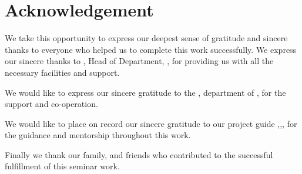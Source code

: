 \chapter*{Acknowledgement}%
%



\par We take this opportunity to express our deepest sense of gratitude and sincere thanks to everyone who helped us to complete this work successfully. We express our sincere thanks to \hod, Head of Department, \dept, \college\hspace*{2pt} \collegeplace \hspace*{2pt} for providing  us with all the necessary facilities and support.\par

We would like to express our sincere gratitude to the \projcordinatorA, \hspace*{2pt} department of \hspace*{2pt} \dept, \hspace*{2pt} \college \hspace*{2pt} \collegeplace \hspace*{2pt} for the support and co-operation.

We would like to place on record our sincere gratitude to our project guide \guide,\hspace*{2pt}\guidedes,\hspace*{2pt}\dept,\hspace*{2pt}\college \hspace*{2pt} %
for the guidance and mentorship throughout this work.

Finally we thank our family, and friends who contributed to the successful fulfillment of this seminar work.

\vspace*{30pt}
\begin{flushright}
	\textbf{\studentA}\\
	\textbf{\studentB}\\
	\textbf{\studentC}\\
	\textbf{\studentD}\\
\end{flushright}
\thispagestyle{plain}
